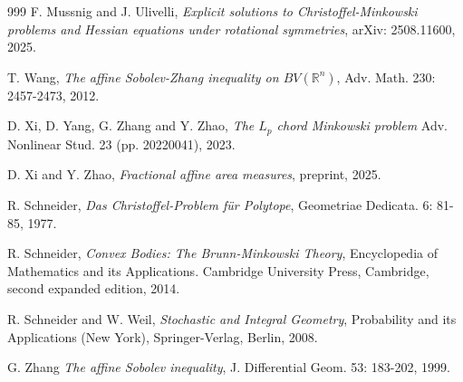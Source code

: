\documentclass[12pt, oneside,reqno]{amsart}
\numberwithin{equation}{section}
\newtheorem{definition and theorem}[theorem]{Definition and Theorem}
\theoremstyle{plain}
\theoremstyle{remark}
\theoremstyle{definition}
\newcommand{\rn}{\mathbb R^n}
\begin{document}
\begin{thebibliography}{999}
F. Mussnig and J. Ulivelli,
\emph{Explicit solutions to Christoffel-Minkowski problems and Hessian equations under rotational symmetries},
arXiv: 2508.11600, 2025.

T. Wang,
\emph{The affine Sobolev-Zhang inequality on $BV(\rn)$}, Adv. Math. 230: 2457-2473, 2012.

D. Xi, D. Yang, G. Zhang and Y. Zhao,
\emph{The $L_p$ chord Minkowski problem}
Adv. Nonlinear Stud. 23 (pp. 20220041), 2023.

D. Xi and Y. Zhao,
\emph{Fractional affine area measures}, preprint, 2025.

R. Schneider,
\emph{Das Christoffel-Problem f{\"u}r Polytope},
Geometriae Dedicata. 6: 81-85, 1977.

R. Schneider,
\emph{Convex Bodies: The Brunn-Minkowski Theory},
 Encyclopedia of Mathematics and its Applications. Cambridge
 University Press, Cambridge, second expanded edition, 2014.

R. Schneider and W. Weil,
\emph{Stochastic and Integral Geometry},
Probability and its Applications (New York), Springer-Verlag, Berlin, 2008.

G. Zhang
\emph{The affine Sobolev inequality}, J. Differential Geom. 53: 183-202, 1999.

\end{thebibliography}
\end{document}
